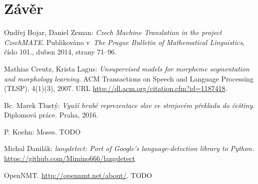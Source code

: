 \documentclass[a4]{article}
\begin{document}
\section{Závěr}


\begin{thebibliography}{99}



 Ondřej Bojar, Daniel Zeman: {\sl Czech Machine Translation in the project
 CzechMATE}. Publikováno v~{\sl The Prague Bulletin of Mathematical
 Linguistics}, číslo 101., duben 2014, strany 71–96.

	Mathias Creutz, Krista Lagus: {\sl Unsupervised models for morpheme
	segmentation and
	morphology learning}. ACM Transactions on Speech and Language Processing
	(TLSP), 4(1)(3),
	2007. URL \url{http://dl.acm.org/citation.cfm?id=1187418}.

 Bc. Marek Tlustý: {\sl  Využí hrubé reprezentace slov ve strojovém
překladu do češtiny}. Diplomová práce. Praha, 2016.

 P. Koehn: Moses. TODO 



 Michal Danilák: {\sl langdetect: Port of Google's language-detection library to
 Python.}
 \url{https://github.com/Mimino666/langdetect}

 OpenNMT. \url{http://opennmt.net/about/}. TODO





\end{thebibliography}
\end{document}
